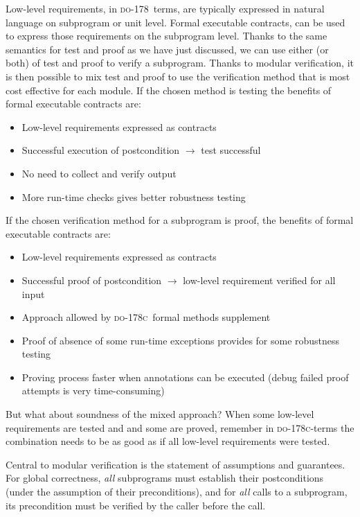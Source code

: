 \documentclass[sttt,draft]{svjour}
\newcommand{\DO}{\textsc{do-178}}
\newcommand{\DOC}{\textsc{do-178c}}
\begin{document}
Low-level requirements, in \DO\ terms, are typically expressed in
natural language on subprogram or unit level. Formal executable
contracts, can be used to express those requirements on the
subprogram level. Thanks to the same semantics for test and proof as
we have just discussed, we can use either (or both) of test and proof
to verify a subprogram. Thanks to modular verification, it is then
possible to mix test and proof to use the verification method that is
most cost effective for each module. If the chosen method is testing
the benefits of formal executable contracts are:
\begin{itemize}
\item Low-level requirements expressed as contracts
\item Successful execution of postcondition $\rightarrow$ test successful
\item No need to collect and verify output
\item More run-time checks gives better robustness testing
\end{itemize}
If the chosen verification method for a subprogram is proof, the
benefits of formal executable contracts are:  
\begin{itemize}
\item Low-level requirements expressed as contracts
\item Successful proof of postcondition $\rightarrow$ low-level
  requirement verified for all input
\item Approach allowed by \DOC\ formal methods supplement
\item Proof of absence of some run-time exceptions provides for some
  robustness testing
\item Proving process faster when annotations can be executed (debug failed proof attempts is very time-consuming)
\end{itemize}

But what about soundness of the mixed approach? When some low-level
requirements are tested and and some are proved, remember in
\DOC-terms the combination needs to be as good as if all low-level
requirements were tested.

Central to modular verification is the statement of assumptions and
guarantees. For global correctness, \emph{all} subprograms must
establish their postconditions (under the assumption of their
preconditions), and for \emph{all} calls to a subprogram, its
precondition must be verified by the caller before the call.
\end{document}
